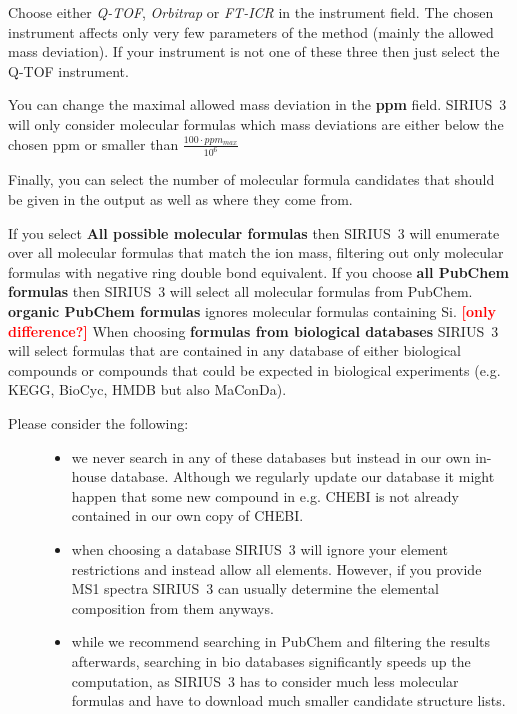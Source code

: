 \documentclass[letterpaper,10pt,openany,oneside]{sphinxmanual}
\newcommand{\todo}[1]{\xspace{\bfseries\sffamily\textcolor{red}{[#1]}}\xspace}
\begin{document}
Choose either \emph{Q-TOF}, \emph{Orbitrap} or \emph{FT-ICR} in the instrument field. The chosen instrument affects only very few parameters of the method (mainly the allowed mass deviation). If your instrument is not one of these three then just select the Q-TOF instrument.

You can change the maximal allowed mass deviation in the \textbf{ppm} field. SIRIUS~3 will only consider molecular formulas which mass deviations are either below the chosen ppm or smaller than \(\frac{100 \cdot ppm_{max}}{10^6}\)

Finally, you can select the number of molecular formula candidates that should be given in the output as well as where they come from.

If you select \textbf{All possible molecular formulas} then SIRIUS~3 will 
enumerate over all molecular formulas that match the ion mass, filtering out 
only molecular formulas with negative ring double bond equivalent. If you 
choose \textbf{all PubChem formulas} then SIRIUS~3 will select all molecular 
formulas from PubChem. 
\textbf{organic PubChem formulas} ignores molecular formulas containing Si. 
\todo{only difference?}
When choosing \textbf{formulas from biological databases} SIRIUS~3 will select 
formulas that are contained in any database of either biological compounds or 
compounds that could be expected in biological experiments (e.g. KEGG, BioCyc, 
HMDB but also MaConDa).
\begin{description}
\item[{Please consider the following:}] \leavevmode\begin{itemize}
\item {} 
we never search in any of these databases but instead in our own in-house database. Although we regularly update our database it might happen that some new compound in e.g. CHEBI is not already contained in our own copy of CHEBI.

\item {} 
when choosing a database SIRIUS~3 will ignore your element restrictions and instead allow all elements. However, if you provide MS1 spectra SIRIUS~3 can usually determine the elemental composition from them anyways.

\item {} 
while we recommend searching in PubChem and filtering the results afterwards, searching in bio databases significantly speeds up the computation, as SIRIUS~3 has to consider much less molecular formulas and have to download much smaller candidate structure lists.

\end{itemize}

\end{description}
\end{document}
